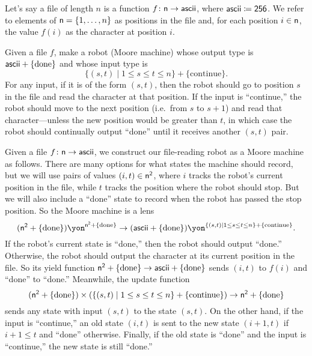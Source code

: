 \documentclass[Book-Poly]{subfiles}
\begin{document}
\begin{exercise}\label{exc.file_reader}
Let's say a file of length $n$ is a function $f\colon\mathsf{n}\to\mathsf{ascii}$, where $\mathsf{ascii}\coloneqq\textsf{2}\textsf{5}\textsf{6}$.
We refer to elements of $\mathsf{n}=\{1,\ldots,n\}$ as positions in the file and, for each position $i \in \mathsf{n}$, the value $f(i)$ as the character at position $i$.

Given a file $f$, make a robot (Moore machine) whose output type is $\mathsf{ascii} + \{\text{done}\}$
and whose input type is
\[
\{(s,t)\mid 1\leq s\leq t\leq n\}+\{\text{continue}\}.
\]
For any input, if it is of the form $(s,t)$, then the robot should go to position $s$ in the file and read the character at that position.
If the input is ``continue,'' the robot should move to the next position (i.e.\ from $s$ to $s+1$) and read that character—unless the new position would be greater than $t$, in which case the robot should continually output ``done'' until it receives another $(s,t)$ pair.
\begin{solution}
Given a file $f \colon \mathsf{n} \to \mathsf{ascii}$, we construct our file-reading robot as a Moore machine as follows.
There are many options for what states the machine should record, but we will use pairs of values $(i, t) \in \mathsf{n}^{\textsf{2}}$, where $i$ tracks the robot's current position in the file, while $t$ tracks the position where the robot should stop.
But we will also include a ``done'' state to record when the robot has passed the stop position.
So the Moore machine is a lens
\[
    (\ord{n}^\2+\{\text{done}\})\yon^{\ord{n}^\2+\{\text{done}\}} \to (\Set{ascii} + \{\text{done}\})\yon^{\{(s,t)\mid 1\leq s\leq t\leq n\}+\{\text{continue}\}}.
\]
If the robot's current state is ``done,'' then the robot should output ``done.'' Otherwise, the robot should output the character at its current position in the file.
So its yield function $\mathsf{n}^{\textsf{2}}+\{\text{done}\} \to \mathsf{ascii} + \{\text{done}\}$ sends $(i, t)$ to $f(i)$ and ``done'' to ``done.''
Meanwhile, the update function
\[
    (\mathsf{n}^{\textsf{2}}+\{\text{done}\}) \times (\{(s,t)\mid 1\leq s\leq t\leq n\}+\{\text{continue}\}) \to \mathsf{n}^{\textsf{2}}+\{\text{done}\}
\]
sends any state with input $(s,t)$ to the state $(s,t)$.
On the other hand, if the input is ``continue,'' an old state $(i,t)$ is sent to the new state $(i+1,t)$ if $i + 1 \leq t$ and ``done'' otherwise.
Finally, if the old state is ``done'' and the input is ``continue,'' the new state is still ``done.''
\end{solution}
\end{exercise}
\end{document}
